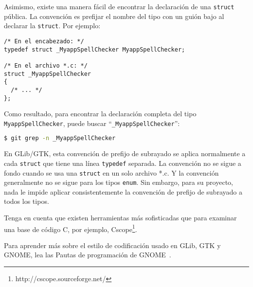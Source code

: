 Asimismo, existe una manera fácil de encontrar la declaración de una \lstinline{struct} pública. La convención es prefijar el nombre del tipo con un guión bajo al declarar la \lstinline{struct}. Por ejemplo:

\begin{lstlisting}[style=GLib/GTK]
/* En el encabezado: */
typedef struct _MyappSpellChecker MyappSpellChecker;

/* En el archivo *.c: */
struct _MyappSpellChecker
{
  /* ... */
};
\end{lstlisting}

Como resultado, para encontrar la declaración completa del tipo \lstinline{MyappSpellChecker}, puede buscar ``\lstinline{_MyappSpellChecker}'':

\begin{lstlisting}[language=bash]
$ git grep -n _MyappSpellChecker
\end{lstlisting}

En GLib/GTK, esta convención de prefijo de subrayado se aplica normalmente a cada \lstinline{struct} que tiene una línea \lstinline{typedef} separada. La convención no se sigue a fondo cuando se usa una \lstinline{struct} en un solo archivo *.c. Y la convención generalmente no se sigue para los tipos \lstinline{enum}. Sin embargo, para su proyecto, nada le impide aplicar consistentemente la convención de prefijo de subrayado a todos los tipos.

Tenga en cuenta que existen herramientas más sofisticadas que  para examinar una base de código C, por ejemplo, Cscope\footnote{http://cscope.sourceforge.net/}.

Para aprender más sobre el estilo de codificación usado en GLib, GTK y GNOME, lea las Pautas de programación de GNOME~\cite{gnome-programming-guidelines}.